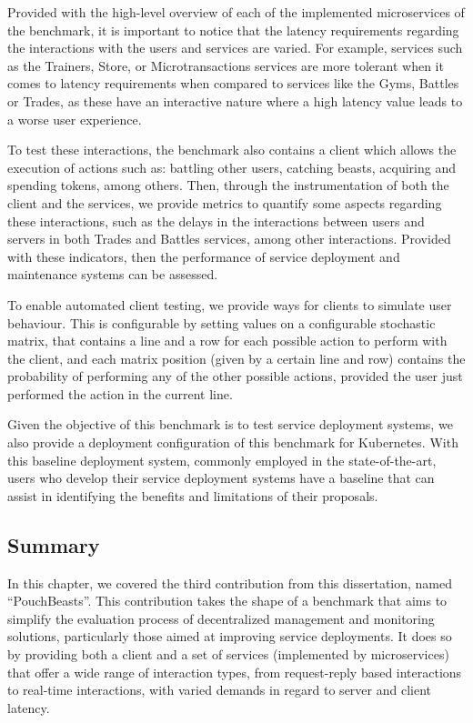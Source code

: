 Provided with the high-level overview of each of the implemented microservices of the benchmark, it is important to notice that the latency requirements regarding the interactions with the users and services are varied. For example, services such as the Trainers, Store, or Microtransactions services are more tolerant when it comes to latency requirements when compared to services like the Gyms, Battles or Trades, as these have an interactive nature where a high latency value leads to a worse user experience.

To test these interactions, the benchmark also contains a client which allows the execution of actions such as: battling other users, catching beasts, acquiring and spending tokens, among others. Then, through the instrumentation of both the client and the services, we provide metrics to quantify some aspects regarding these interactions, such as the delays in the interactions between users and servers in both Trades and Battles services, among other interactions. Provided with these indicators, then the performance of service deployment and maintenance systems can be assessed.

To enable automated client testing, we provide ways for clients to simulate user behaviour. This is configurable by setting values on a configurable stochastic matrix, that contains a line and a row for each possible action to perform with the client, and each matrix position (given by a certain line and row) contains the probability of performing any of the other possible actions, provided the user just performed the action in the current line. 

Given the objective of this benchmark is to test service deployment systems, we also provide a deployment configuration of this benchmark for Kubernetes. With this baseline deployment system, commonly employed in the state-of-the-art, users who develop their service deployment systems have a baseline that can assist in identifying the benefits and limitations of their proposals.

\subsection{Summary}

In this chapter, we covered the third contribution from this dissertation, named ``PouchBeasts''. This contribution takes the shape of a benchmark that aims to simplify the evaluation process of decentralized management and monitoring solutions, particularly those aimed at improving service deployments. It does so by providing both a client and a set of services (implemented by microservices) that offer a wide range of interaction types, from request-reply based interactions to real-time interactions, with varied demands in regard to server and client latency.

